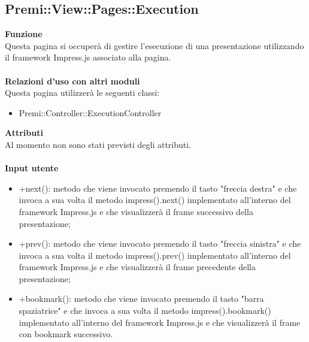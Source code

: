 {					\subsection{Premi::View::Pages::Execution}{
						\textbf{Funzione}\\
						\indent Questa pagina si occuperà di gestire l'esecuzione di una presentazione utilizzando il framework Impress.js associato alla pagina.\\\\
						\textbf{Relazioni d'uso con altri moduli}\\
						\indent Questa pagina utilizzerà le seguenti classi:
						\begin{itemize}
							\item Premi::Controller::ExecutionController
						\end{itemize}
						\textbf{Attributi}\\
						\indent Al momento non sono stati previsti degli attributi.\\\\
						\textbf{Input utente}
						\begin{itemize}
							\item +next(): metodo che viene invocato premendo il tasto "freccia destra" e che invoca a sua volta il metodo impress().next() implementato all'interno del framework Impress.js e che visualizzerà il frame successivo della presentazione;
							\item +prev(): metodo che viene invocato premendo il tasto "freccia sinistra" e che invoca a sua volta il metodo impress().prev() implementato all'interno del framework Impress.js e che visualizzerà il frame precedente della presentazione;
							\item +bookmark(): metodo che viene invocato premendo il tasto "barra spaziatrice" e che invoca a sua volta il metodo impress().bookmark() implementato all'interno del framework Impress.js e che visualizzerà il frame con bookmark successivo.
						\end{itemize}
					}
}
